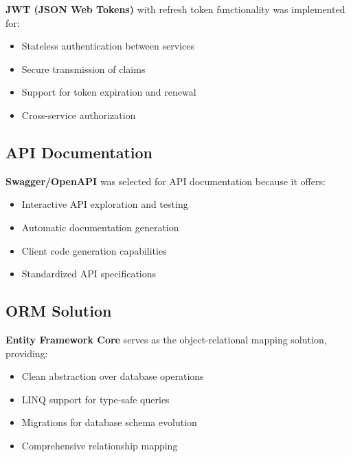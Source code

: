 \textbf{JWT (JSON Web Tokens)} with refresh token functionality was implemented for:
\begin{itemize}
    \item Stateless authentication between services
    \item Secure transmission of claims
    \item Support for token expiration and renewal
    \item Cross-service authorization
\end{itemize}

\subsection*{API Documentation}

\textbf{Swagger/OpenAPI} was selected for API documentation because it offers:
\begin{itemize}
    \item Interactive API exploration and testing
    \item Automatic documentation generation
    \item Client code generation capabilities
    \item Standardized API specifications
\end{itemize}

\subsection*{ORM Solution}

\textbf{Entity Framework Core} serves as the object-relational mapping solution, providing:
\begin{itemize}
    \item Clean abstraction over database operations
    \item LINQ support for type-safe queries
    \item Migrations for database schema evolution
    \item Comprehensive relationship mapping
\end{itemize}

